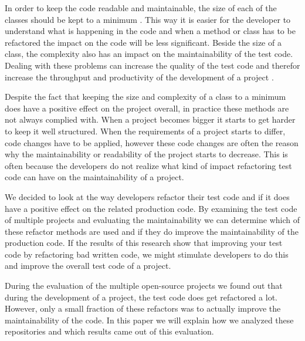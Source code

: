 In order to keep the code readable and maintainable, the size of each of the
classes should be kept to a minimum \cite{baggen2012standardized}. This way it
is easier for the developer to understand what is happening in the code and when
a method or class has to be refactored the impact on the code will be less
significant. Beside the size of a class, the complexity also has an impact on
the maintainability of the test code. Dealing with these problems can increase
the quality of the test code and therefor increase the throughput and
productivity of the development of a project \cite{athanasiou2011constructing}.

Despite the fact that keeping the size and complexity of a class to a minimum
does have a positive effect on the project overall, in practice these methods
are not always complied with. When a project becomes bigger it starts to get
harder to keep it well structured. When the requirements of a project starts to
differ, code changes have to be applied, however these code changes are often
the reason why the maintainability or readability of the project starts to
decrease. This is often because the developers do not realize what kind of
impact refactoring test code can have on the maintainability of a project.

We decided to look at the way developers refactor their test code and if it does
have a positive effect on the related production code. By examining the test
code of multiple projects and evaluating the maintainability we can determine
which of these refactor methods are used and if they do improve the
maintainability of the production code. If the results of this research show
that improving your test code by refactoring bad written code, we might
stimulate developers to do this and improve the overall test code of a project.

During the evaluation of the multiple open-source projects we found out that
during the development of a project, the test code does get refactored a lot.
However, only a small fraction of these refactors was to actually improve the
maintainability of the code. In this paper we will explain how we analyzed these
repositories and which results came out of this evaluation.
